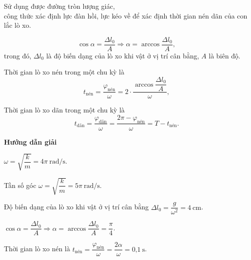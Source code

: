 \begin{dang}{Sử dụng được đường tròn lượng giác,\\ công thức xác định lực đàn hồi, lực kéo về để xác định thời gian nén dãn của con lắc lò xo.
	}
{\begin{itemize}
			\begin{equation*} 
				\cos \alpha=\dfrac{\Delta l_0}{A}\Rightarrow \alpha=\arccos \dfrac{\Delta l_0}{A},
			\end{equation*}
			trong đó, $\Delta l_0$ là độ biến dạng của lò xo khi vật ở vị trí cân bằng, $A$ là biên độ.
			
			Thời gian lò xo nén trong một chu kỳ là
			\begin{equation*} 
				t_\text{nén}=\dfrac{\varphi_\text{nén}}{\omega}=2\cdot \dfrac{\arccos \dfrac{\Delta l_0}{A}}{\omega},
			\end{equation*}
			
			Thời gian lò xo dãn trong một chu kỳ là
			\begin{equation*} 
				t_\text{dãn}=\dfrac{\varphi_\text{dãn}}{\omega}=\dfrac{2\pi-\varphi_\text{nén}}{\omega}=T-t_\text{nén}.
			\end{equation*}
			
			
			
		\end{itemize}
		
		
	}
	
	{\begin{center}
			\textbf{Hướng dẫn giải}
		\end{center}
		
		$\omega=\sqrt{\dfrac{k}{m}}=4\pi\ \text{rad/s}$.
		
		Tần số góc $\omega=\sqrt{\dfrac{k}{m}}=5\pi\ \text{rad/s}$.
		
		Độ biến dạng của lò xo khi vật ở vị trí cân bằng $\Delta l_0=\dfrac{g}{\omega^2}=\text{4}\ \text{cm}$.
		
		$\cos \alpha=\dfrac{\Delta l_0}{A}\Rightarrow \alpha=\arccos \dfrac{\Delta l_0}{A}=\dfrac{\pi}{4}$.
		
		Thời gian lò xo nén là $t_\text{nén}=\dfrac{\varphi_\text{nén}}{\omega}=\dfrac{2\alpha}{\omega}=\text{0,1}\ \text{s}$.
		
}
\end{dang}
